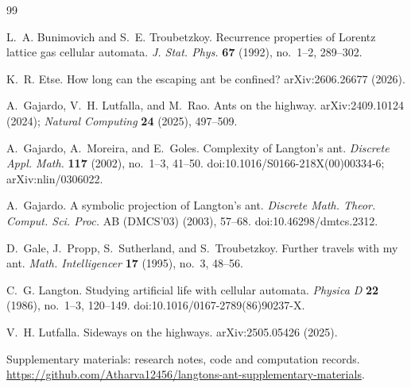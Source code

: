 \documentclass[11pt,letterpaper]{article}
\theoremstyle{plain}
\theoremstyle{definition}
\begin{document}
\begin{thebibliography}{99}

L.~A. Bunimovich and S.~E. Troubetzkoy.
\newblock Recurrence properties of {L}orentz lattice gas cellular automata.
\newblock \emph{J. Stat. Phys.} \textbf{67} (1992), no.~1--2, 289--302.

K.~R. Etse.
\newblock How long can the escaping ant be confined?
\newblock arXiv:2606.26677 (2026).

A.~Gajardo, V.~H. Lutfalla, and M.~Rao.
\newblock Ants on the highway.
\newblock arXiv:2409.10124 (2024); \emph{Natural Computing} \textbf{24} (2025), 497--509.

A.~Gajardo, A.~Moreira, and E.~Goles.
\newblock Complexity of {L}angton's ant.
\newblock \emph{Discrete Appl. Math.} \textbf{117} (2002), no.~1--3, 41--50.
\newblock doi:10.1016/S0166-218X(00)00334-6; arXiv:nlin/0306022.

A.~Gajardo.
\newblock A symbolic projection of {L}angton's ant.
\newblock \emph{Discrete Math. Theor. Comput. Sci. Proc.} AB (DMCS'03)
  (2003), 57--68.
\newblock doi:10.46298/dmtcs.2312.

D.~Gale, J.~Propp, S.~Sutherland, and S.~Troubetzkoy.
\newblock Further travels with my ant.
\newblock \emph{Math. Intelligencer} \textbf{17} (1995), no.~3, 48--56.

C.~G. Langton.
\newblock Studying artificial life with cellular automata.
\newblock \emph{Physica D} \textbf{22} (1986), no.~1--3, 120--149.
\newblock doi:10.1016/0167-2789(86)90237-X.

V.~H. Lutfalla.
\newblock Sideways on the highways.
\newblock arXiv:2505.05426 (2025).

Supplementary materials: research notes, code and computation records.
\newblock \url{https://github.com/Atharva12456/langtons-ant-supplementary-materials}.
\end{thebibliography}
\end{document}
